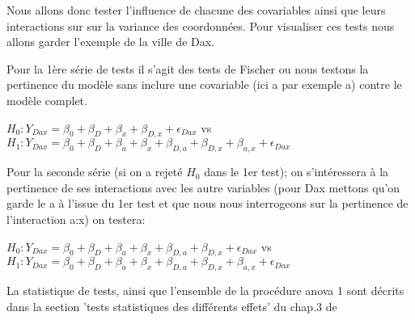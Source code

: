 \documentclass[french]{article}%
\begin{document}
			Nous allons donc tester l'influence de chacune des covariables ainsi que leurs interactions sur sur la variance des coordonnées. Pour visualiser ces tests nous allons garder l'exemple de la ville de Dax.
			
			Pour la 1ère série de tests il s'agit des tests de Fischer ou nous testons la pertinence du modèle sans inclure une covariable (ici a par exemple a) contre le modèle complet.
			
			$H_{0}:Y_{Dax}=\beta_{0}+\beta_{D}+\beta_{x}+\beta_{D,x}+\epsilon_{Dax}$ vs $H_{1}:Y_{Dax}=\beta_{0}+\beta_{D}+\beta_{a}+\beta_{x}+\beta_{D,a}+\beta_{D,x}+\beta_{a,x}+\epsilon_{Dax}$
			
%			
%			

			Pour la seconde série (si on a rejeté $H_{0}$ dans le 1er test); on s'intéressera à la pertinence de ses interactions avec les autre variables (pour Dax mettons qu'on garde le a à l'issue du 1er test et que nous nous interrogeons sur la pertinence de l'interaction a:x) on testera:
			
			$H_{0}:Y_{Dax}=\beta_{0}+\beta_{D}+\beta_{a}+\beta_{x}+\beta_{D,a}+\beta_{D,x}+\epsilon_{Dax}$ vs $H_{1}:Y_{Dax}=\beta_{0}+\beta_{D}+\beta_{a}+\beta_{x}+\beta_{D,a}+\beta_{D,x}+\beta_{a,x}+\epsilon_{Dax}$
			
%			
%			
%			

			La statistique de tests, ainsi que l'ensemble de la procédure anova 1 sont décrits dans la section 'tests statistiques des différents effets' du chap.3 de \cite{Donnet}
			
\end{document}
